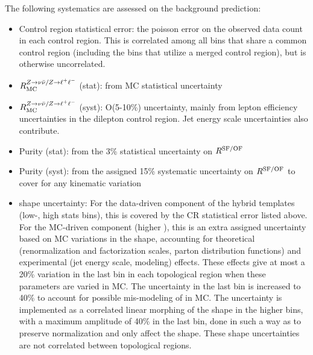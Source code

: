 The following systematics are assessed on the \znunu background prediction:
\begin{itemize}\setlength\itemsep{0mm}
\item Control region statistical error: the poisson error on the observed data count in each \zll control region.
This is correlated among all bins that share a common control region (including the \mttwo bins that utilize a merged control region),
but is otherwise uncorrelated.
\item $R_{\mathrm{MC}}^{Z\to\nu\bar{\nu}/Z\to\ell^+\ell^-}$ (stat): from MC statistical uncertainty
\item $R_{\mathrm{MC}}^{Z\to\nu\bar{\nu}/Z\to\ell^+\ell^-}$ (syst): O(5-10\%) uncertainty, mainly from lepton efficiency
uncertainties in the dilepton control region. Jet energy scale uncertainties also contribute.
\item Purity (stat): from the 3\% statistical uncertainty on $R^{\mathrm{SF/OF}}$
\item Purity (syst): from the assigned 15\% systematic uncertainty on $R^{\mathrm{SF/OF}}$ to cover
for any kinematic variation
\item \mttwo shape uncertainty: For the data-driven component of the hybrid templates (low-\mttwo,
  high stats bins), this is covered by the CR statistical error listed above. For the MC-driven
  component (higher \mttwo), this is an extra assigned uncertainty based on MC variations in 
  the \mttwo shape, accounting for theoretical (renormalization and factorization scales, parton
  distribution functions) and experimental (jet energy scale, \ptmiss modeling) effects. These
  effects give at most a 20\% variation in the last \mttwo bin in each topological region when
  these parameters are varied in MC. The uncertainty in the last bin is increased to 40\% to
  account for possible mis-modeling of \mttwo in MC. The uncertainty is implemented as a correlated
  linear morphing of the \mttwo shape in the higher \mttwo bins, with a maximum amplitude of 40\% in the last bin, 
  done in such a way as to preserve normalization and only affect the shape. These shape uncertainties
  are not correlated between topological regions.
\end{itemize}

